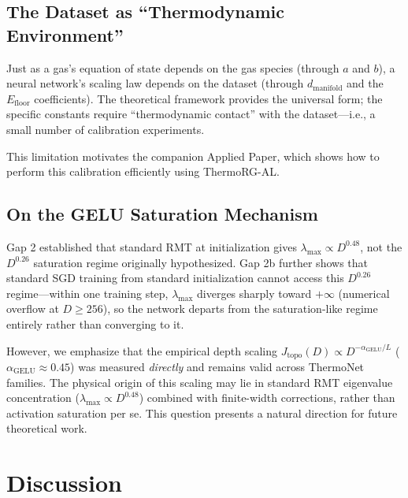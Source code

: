 \documentclass[11pt, a4paper]{article}
\theoremstyle{plain}
\begin{document}
\subsection{The Dataset as ``Thermodynamic Environment''}

Just as a gas's equation of state depends on the gas species (through $a$ and $b$), a neural network's scaling law depends on the dataset (through $d_{\mathrm{manifold}}$ and the $E_{\mathrm{floor}}$ coefficients). The theoretical framework provides the universal form; the specific constants require ``thermodynamic contact'' with the dataset---i.e., a small number of calibration experiments.

This limitation motivates the companion Applied Paper, which shows how to perform this calibration efficiently using ThermoRG-AL.


\subsection{On the GELU Saturation Mechanism}

Gap 2 established that standard RMT at initialization gives
$\lambda_{\max} \propto D^{0.48}$, not the $D^{0.26}$ saturation
regime originally hypothesized. Gap 2b further shows that standard SGD training from standard initialization cannot access this $D^{0.26}$ regime---within one training step, $\lambda_{\max}$ diverges sharply toward $+\infty$ (numerical overflow at $D \geq 256$), so the network departs from the saturation-like regime entirely rather than converging to it.

However, we emphasize that the empirical depth scaling
$J_{\mathrm{topo}}(D) \propto D^{-\alpha_{\mathrm{GELU}}/L}$
($\alpha_{\mathrm{GELU}} \approx 0.45$) was measured \emph{directly}
and remains valid across ThermoNet families. The physical origin
of this scaling may lie in standard RMT eigenvalue concentration
($\lambda_{\max} \propto D^{0.48}$) combined with finite-width
corrections, rather than activation saturation per se.
This question presents a natural direction for future theoretical work.

\section{Discussion}
\end{document}
